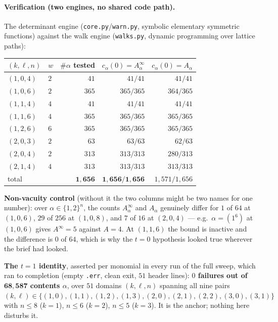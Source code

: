 \documentclass[11pt]{article}
\theoremstyle{plain}
\theoremstyle{definition}
\begin{document}
\paragraph{Verification (two engines, no shared code path).} The determinant engine
(\texttt{core.py}/\texttt{warn.py}, symbolic elementary symmetric functions) against the walk
engine (\texttt{walks.py}, dynamic programming over lattice paths):
\begin{center}\small
\begin{tabular}{@{}llrrr@{}}
\toprule
$(k,\ell,n)$ & $w$ & $\#\alpha$ tested & $c_\alpha(0)=A^\infty_\alpha$ & $c_\alpha(0)=A_\alpha$ \\
\midrule
$(1,0,4)$ & $2$ & $41$  & $41/41$   & $41/41$ \\
$(1,0,6)$ & $2$ & $365$ & $365/365$ & $364/365$ \\
$(1,1,4)$ & $4$ & $41$  & $41/41$   & $41/41$ \\
$(1,1,6)$ & $4$ & $365$ & $365/365$ & $365/365$ \\
$(1,2,6)$ & $6$ & $365$ & $365/365$ & $365/365$ \\
$(2,0,3)$ & $2$ & $63$  & $63/63$   & $62/63$ \\
$(2,0,4)$ & $2$ & $313$ & $313/313$ & $280/313$ \\
$(2,1,4)$ & $4$ & $313$ & $313/313$ & $313/313$ \\
\midrule
total & & $\mathbf{1{,}656}$ & $\mathbf{1{,}656/1{,}656}$ & $1{,}571/1{,}656$ \\
\bottomrule
\end{tabular}
\end{center}
\textbf{Non-vacuity control} (without it the two columns might be two names for one number):
over $\alpha\in\{1,2\}^n$, the counts $A^\infty_\alpha$ and $A_\alpha$ genuinely differ for
$1$ of $64$ at $(1,0,6)$, $29$ of $256$ at $(1,0,8)$, and $7$ of $16$ at $(2,0,4)$ --- e.g.\
$\alpha=(1^6)$ at $(1,0,6)$ gives $A^\infty=5$ against $A=4$. At $(1,1,6)$ the bound is
inactive and the difference is $0$ of $64$, which is why the $t=0$ hypothesis looked true
wherever the brief had looked.

\textbf{The $t=1$ identity}, asserted per monomial in every run of the full sweep, which ran
to completion (empty \texttt{.err}, clean exit, $51$ header lines): \textbf{$0$ failures out of
$\mathbf{68{,}587}$ contents $\alpha$}, over $51$ domains $(k,\ell,n)$ spanning all nine pairs
$(k,\ell)\in\{(1,0),(1,1),(1,2),(1,3),(2,0),(2,1),(2,2),(3,0),(3,1)\}$ with $n\le 8$ ($k=1$),
$n\le6$ ($k=2$), $n\le5$ ($k=3$). It is the anchor; nothing here disturbs it.
\end{document}
